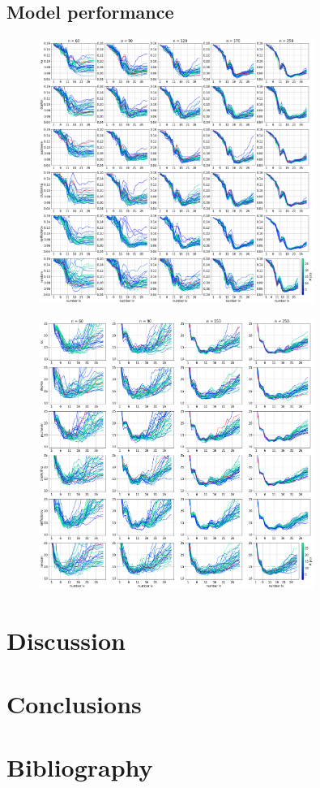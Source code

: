 \documentclass{article}
\begin{document}
\subsection*{Model performance}\label{results:modperformance}


\begin{figure}[b]
\includegraphics[width=0.8\textwidth]{manuscript/figures/d01_milk_model_performance.png}
\centering
\caption{}
\label{fig_d01_milk_model_performance}
\end{figure}


\begin{figure}[b]
\includegraphics[width=0.8\textwidth]{manuscript/figures/d02_manure_model_performance.png}
\centering
\caption{}
\label{fig_d02_manure_model_performance}
\end{figure}


\section*{Discussion}\label{discussion}

\section*{Conclusions}\label{conclusions}

\section*{Bibliography}
\end{document}
